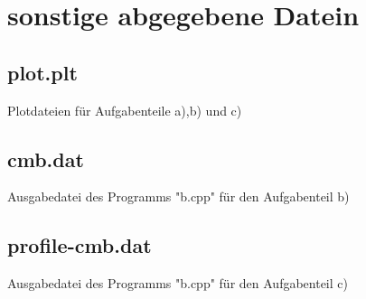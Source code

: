 \documentclass{scrreprt}
\begin{document}
\section*{sonstige abgegebene Datein}
\subsection*{plot.plt}
Plotdateien für Aufgabenteile a),b) und c)
\subsection*{cmb.dat}
Ausgabedatei des Programms "b.cpp" für den Aufgabenteil b)
\subsection*{profile-cmb.dat}
Ausgabedatei des Programms "b.cpp" für den Aufgabenteil c)
\end{document}
